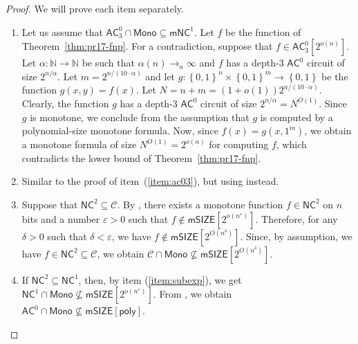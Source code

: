 \documentclass[10pt,a4paper]{article}
\newcommand{\eps}{\varepsilon}
\newcommand{\poly}{\mathsf{poly}}
\newcommand{\complexityfont}[1]{\mathsf{#1}}
\newcommand{\monclass}[1]{\mathsf{m}#1}
\def\mNC          {\monclass{\NC}}
\def\AC           {\complexityfont{AC}}
\def\NC           {\complexityfont{NC}}
\def\SIZE         {\complexityfont{SIZE}}
\def\mSIZE        {\monclass{\SIZE}}
\newcommand{\semMon}[1]{#1 \cap \monfns}
\newcommand{\monfns}{\mathsf{Mono}}
\def\sseq{\subseteq}
\newcommand{\set}[1]{\left\{#1\right\}}
\newcommand{\blt}{\set{0,1}}
\def\bbn{{\mathbb N}}
\def\calc{{\mathcal C}}
\begin{document}
\begin{proof}
    We will prove each item separately.
    \begin{enumerate}[label=\emph{Proof of (\arabic*)}., leftmargin=*]
        \item 
            Let us assume that
            $\semMon{\AC^0_3} \subseteq \mNC^1$.
            Let $f$ be the function of Theorem~\ref{thm:pr17-fnp}.
            For a contradiction,  suppose that 
            $f \in 
            \AC^0_3[2^{o(n)}]$.
            Let $\alpha : \bbn \to \bbn$ be such that
            $\alpha(n) \to_n \infty$
            and
            $f$ has a depth-3 $\AC^0$ circuit
            of size
            $2^{n/\alpha}$.
            Let $m = 2^{n/(10\cdot\alpha)}$
            and
            let $g : \blt^n \times \blt^m \to \blt$
            be the function
            $g(x,y) = f(x)$.
            Let $N = n+m = (1+o(1))2^{n/(10\cdot\alpha)}$.
            Clearly, the function $g$ has 
            a depth-3 $\AC^0$ circuit 
            of size $2^{n/\alpha} = N^{O(1)}$.
            Since $g$ is monotone,
            we conclude from the assumption 
            that $g$ is computed by a polynomial-size monotone formula.
            Now, since $f(x) = g(x,1^{m})$,
            we obtain a monotone formula of size
            $N^{O(1)} = 2^{o(n)}$ for computing $f$,
             which contradicts the lower bound of
             Theorem~\ref{thm:pr17-fnp}.
        \item 
            Similar to the proof of item~(\ref{item:ac03}),
            but using  instead.
        \item 
            Suppose that $\NC^2 \sseq \calc$.
            By , there exists a monotone function $f \in \NC^2$
            on $n$ bits
            and a number $\eps > 0$
            such that
            $f \notin \mSIZE[2^{o(n^{\eps})}]$.
            Therefore, for any $\delta > 0$ such that $\delta < \eps$,
            we have $f \notin \mSIZE[2^{O(n^\delta)}]$.
            Since, by assumption, we have $f \in \NC^2 \sseq \calc$,
            we obtain
            $\semMon{\calc} \not\sseq \mSIZE[2^{O(n^\delta)}]$.
        \item 
            If $\NC^2 \sseq \NC^1$, then,
            by 
            item (\ref{item:subexp}),
            we get
            $\semMon{\NC^1} \not\sseq \mSIZE[2^{o(n^\eps)}]$.
            From ,
            we obtain
            $\semMon{\AC^0} 
            \not\sseq \mSIZE[\poly]$.
            \qedhere
    \end{enumerate}
\end{proof}
\end{document}
